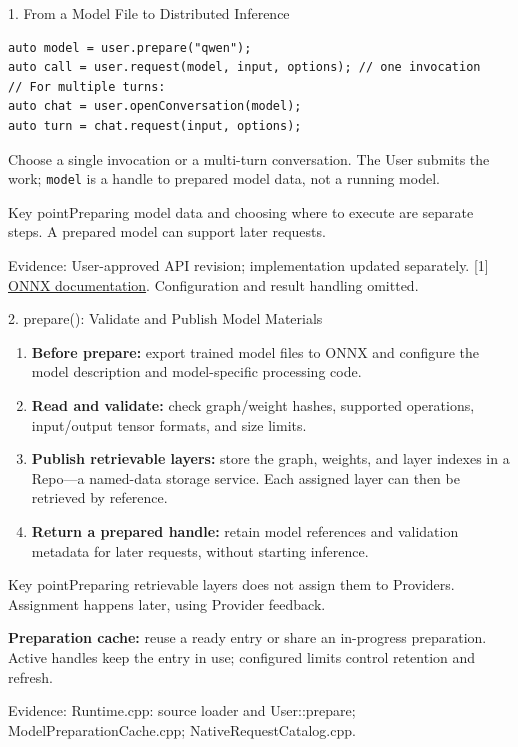 \documentclass[10pt,aspectratio=169]{beamer}
\newcommand{\src}[1]{\vfill{\fontsize{6.5}{8}\selectfont\color{Gray}Evidence: #1\par}}
\newcommand{\point}[1]{\begin{block}{Key point}\small #1\end{block}}
\begin{document}
\begin{frame}[fragile]{1. From a Model File to Distributed Inference}
\begin{center}\end{center}
\begin{lstlisting}
auto model = user.prepare("qwen");
auto call = user.request(model, input, options); // one invocation
// For multiple turns:
auto chat = user.openConversation(model);
auto turn = chat.request(input, options);
\end{lstlisting}
\small Choose a single invocation or a multi-turn conversation. The User submits the work; \texttt{model} is a handle to prepared model data, not a running model.
\point{Preparing model data and choosing where to execute are separate steps. A prepared model can support later requests.}
\src{User-approved API revision; implementation updated separately. [1] \href{https://onnx.ai/onnx/intro/}{ONNX documentation}. Configuration and result handling omitted.}
\end{frame}

\begin{frame}{2. prepare(): Validate and Publish Model Materials}
\small
\begin{enumerate}
\item \textbf{Before prepare:} export trained model files to ONNX and configure the model description and model-specific processing code.
\item \textbf{Read and validate:} check graph/weight hashes, supported operations, input/output tensor formats, and size limits.
\item \textbf{Publish retrievable layers:} store the graph, weights, and layer indexes in a Repo---a named-data storage service. Each assigned layer can then be retrieved by reference.
\item \textbf{Return a prepared handle:} retain model references and validation metadata for later requests, without starting inference.
\end{enumerate}
\point{Preparing retrievable layers does not assign them to Providers. Assignment happens later, using Provider feedback.}
\small \textbf{Preparation cache:} reuse a ready entry or share an in-progress preparation. Active handles keep the entry in use; configured limits control retention and refresh.
\src{Runtime.cpp: source loader and User::prepare; ModelPreparationCache.cpp; NativeRequestCatalog.cpp.}
\end{frame}
\end{document}
